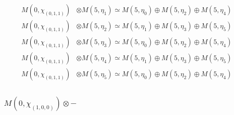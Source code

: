 \begin{align*}
M(0,\chi_{(0,1,1)}) &\otimes M(5,\eta_{1}) \simeq M(5,\eta_{0}) \oplus M(5,\eta_{2}) \oplus M(5,\eta_{4}) \\
M(0,\chi_{(0,1,1)}) &\otimes M(5,\eta_{2}) \simeq M(5,\eta_{1}) \oplus M(5,\eta_{3}) \oplus M(5,\eta_{5}) \\
M(0,\chi_{(0,1,1)}) &\otimes M(5,\eta_{3}) \simeq M(5,\eta_{0}) \oplus M(5,\eta_{2}) \oplus M(5,\eta_{4}) \\
M(0,\chi_{(0,1,1)}) &\otimes M(5,\eta_{4}) \simeq M(5,\eta_{1}) \oplus M(5,\eta_{3}) \oplus M(5,\eta_{5}) \\
M(0,\chi_{(0,1,1)}) &\otimes M(5,\eta_{5}) \simeq M(5,\eta_{0}) \oplus M(5,\eta_{2}) \oplus M(5,\eta_{4}) \\
\end{align*}

\subsubsection{$ M(0,\chi_{(1,0,0)})\otimes -$}
